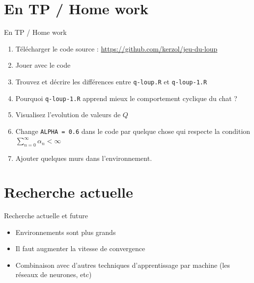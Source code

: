 \documentclass{beamer}
\begin{document}
\section{En TP / Home work}

\begin{frame}{En TP / Home work}

  \begin{enumerate}
  \item Télécharger le code source : \url{https://github.com/kerzol/jeu-du-loup}
  \item Jouer avec le code
  \item Trouvez et décrire les différences entre {\tt q-loup.R} et {\tt q-loup-1.R}
  \item Pourquoi {\tt q-loup-1.R} apprend mieux le comportement cyclique du chat ?
  \item Visualisez l'evolution de valeurs de $Q$
  \item Change {\tt ALPHA = 0.6} dans le code par quelque chose qui
    respecte la condition $\sum_{n=0}^\infty \alpha_n < \infty$
  \item Ajouter quelques murs dans l'environnement.
  \end{enumerate}
\end{frame}


\section{Recherche actuelle}

\begin{frame}{Recherche actuelle et future}

\begin{itemize}
\item Environnements sont plus grands
\item Il faut augmenter la vitesse de convergence
\item Combinaison avec d'autres techniques d'apprentissage par machine
  (les réseaux de neurones, etc)
\end{itemize}
\end{frame}
\end{document}
